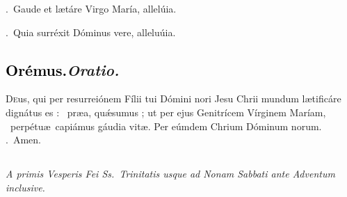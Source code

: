 \documentclass[12pt]{article} %
\newenvironment{rubric}{\vspace{1 mm}\color{benred8} \itshape \leftskip 0in \setlength{\parindent}{0.25in}}{\vspace{1 mm}}
\newenvironment{response}{\leftskip 0in \setlength{\parindent}{0in}}{\vspace{1 mm}}
\let\oldgresixstar\gresixstar
\renewcommand{\gresixstar}{\textcolor{benred8}{\oldgresixstar}}
\let\oldgredagger\gredagger
\renewcommand{\gredagger}{\textcolor{benred8}{\oldgredagger}}
\let\oldVbar\Vbar
\renewcommand{\Vbar}{\textcolor{benred8}{\oldVbar .}}
\let\oldRbar\Rbar
\renewcommand{\Rbar}{\textcolor{benred8}{\oldRbar .}}
\def\capitulumSpace{\hspace{20 mm}}
\begin{document}

\gresetfirstlineaboveinitial{\small \textsc{ \textbf{\textcolor{benred8}{VI}}}}{\small \textsc{ \textbf{\textcolor{benred8}{VI}}}}

\vspace{2mm}

\begin{response}
\Vbar\ Gaude et l\ae t\'{a}re Virgo Mar\'{i}a, allel\'{u}ia.

\Rbar\ Quia surr\'{e}xit D\'{o}minus vere, allelu\'{u}ia.

\end{response}

\subsection*{\textcolor{black}{Or\'{e}mus.}\capitulumSpace \emph{Oratio.}}

\begin{response}\lettrine{D}{e}us, qui per resurrei\'{o}nem F\'{i}lii tui D\'{o}mini nori Jesu Chrii mundum l\ae tific\'{a}re dign\'{a}tus es : \gredagger\ pr\ae{}a, qu\'{\ae}sumus ; ut per ejus Genitr\'{i}cem V\'{i}rginem Mar\'{i}am, \gresixstar\ perp\'{e}tu\ae\ capi\'{a}mus g\'{a}udia vit\ae . Per e\'{u}mdem Chrium D\'{o}minum norum. \Rbar\ Amen.

\end{response}


\subsection*{}

\begin{rubric}
A primis Vesperis Fei Ss.~Trinitatis usque ad Nonam Sabbati ante Adventum inclusive.

\end{rubric}


{\grespacelinestext=4.60mm
\gresetfirstlineaboveinitial{\small \textsc{ \textbf{\textcolor{benred8}{I}}}}{\small \textsc{ \textbf{\textcolor{benred8}{I}}}}

}
\end{document}
